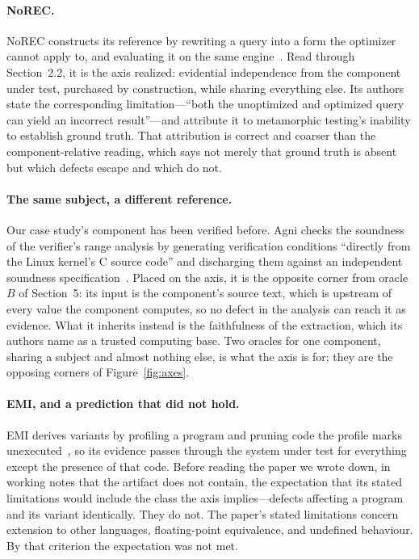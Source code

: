 \paragraph{NoREC.}
NoREC constructs its reference by rewriting a query into a form the optimizer cannot
apply to, and evaluating it on the same engine~\cite{rigger2020norec}. Read through
Section~2.2, it is the axis realized: evidential independence from the component under
test, purchased by construction, while sharing everything else. Its authors state the
corresponding limitation---``both the unoptimized and optimized query can yield an
incorrect result''---and attribute it to metamorphic testing's inability to establish
ground truth. That attribution is correct and coarser than the component-relative
reading, which says not merely that ground truth is absent but which defects escape
and which do not.

\paragraph{The same subject, a different reference.}
Our case study's component has been verified before. Agni checks the soundness of the
verifier's range analysis by generating verification conditions ``directly from the
Linux kernel's C source code'' and discharging them against an independent soundness
specification~\cite{vishwanathan2023agni}. Placed on the axis, it is the opposite
corner from oracle $B$ of Section~5: its input is the component's source text, which
is upstream of every value the component computes, so no defect in the analysis can
reach it as evidence. What it inherits instead is the faithfulness of the extraction,
which its authors name as a trusted computing base. Two oracles for one component,
sharing a subject and almost nothing else, is what the axis is for; they are the
opposing corners of Figure~\ref{fig:axes}.

\paragraph{EMI, and a prediction that did not hold.}
EMI derives variants by profiling a program and pruning code the profile marks
unexecuted~\cite{le2014emi}, so its evidence passes through the system under test for
everything except the presence of that code. Before reading the paper we wrote down, in
working notes that the artifact does not contain, the expectation that its stated limitations would include the class the axis
implies---defects affecting a program and its variant identically. They do not. The
paper's stated limitations concern extension to other languages, floating-point
equivalence, and undefined behaviour. By that criterion the expectation was not
met.

